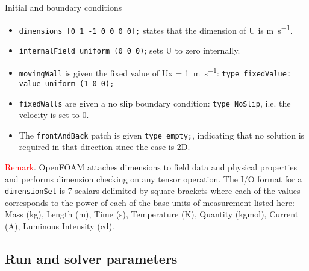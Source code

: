 \documentclass{beamer}
\begin{document}
\begin{frame}{Initial and boundary conditions}
\vspace{-0.2cm}
\begin{itemize}
\item \texttt{dimensions [0 1 -1 0 0 0 0];} states that the dimension of U is \si{\m\per\s}.
\item \texttt{internalField uniform (0 0 0)}; sets U to zero internally.
\item \texttt{movingWall} is given the fixed value of Ux = \SI{1}{\m\per\s}:
\texttt{type fixedValue:} \\
\texttt{value           uniform (1 0 0);} \\
\item \texttt{fixedWalls} are given a no slip boundary condition: \texttt{type NoSlip}, i.e. the velocity is set to 0.  
\item The \texttt{frontAndBack} patch is given \texttt{type empty;}, indicating that no solution is required in that direction since the case is 2D.
\end{itemize}
\vspace{-0.2cm}
\begin{block}

\begin{small}
\textcolor{red}{Remark}. OpenFOAM attaches dimensions to field data and physical properties and performs dimension checking on any tensor operation.
The I/O format for a \texttt{dimensionSet} is 7 scalars delimited by square brackets where each of the values corresponds to the power of each of the base units of measurement listed here: Mass (kg), Length (m), Time (s), Temperature (K), Quantity (kgmol), Current (A), Luminous Intensity (cd).
\end{small}
\end{block}

\end{frame}



\subsection{Run and solver parameters}
\end{document}
